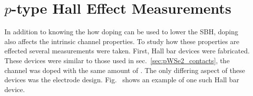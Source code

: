\section{$p$-type  Hall Effect Measurements}\label{sec:pWSe2_hall}
In addition to knowing the how doping can be used to lower the \acs{SBH}, doping also affects the intrinsic channel properties. To study how these properties are effected several measurements were taken. First, Hall bar devices were fabricated. These devices were similar to those used in sec.~\ref{sec:pWSe2_contacts}, the channel was doped with the same amount of . The only differing aspect of these devices was the electrode design. Fig.~ shows an example of one such Hall bar device. \\ \\

